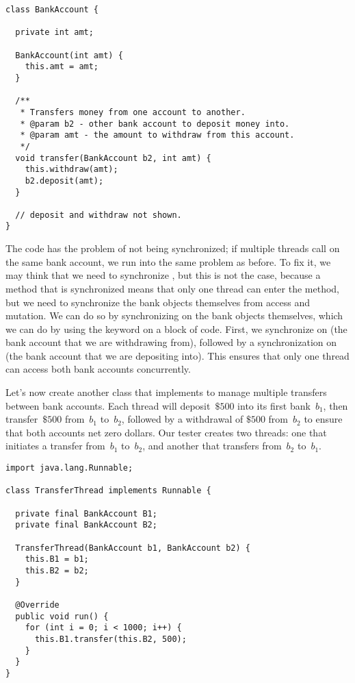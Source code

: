 \begin{lstlisting}[language=MyJava]
class BankAccount {

  private int amt;

  BankAccount(int amt) { 
    this.amt = amt; 
  }

  /**
   * Transfers money from one account to another.
   * @param b2 - other bank account to deposit money into.
   * @param amt - the amount to withdraw from this account.
   */
  void transfer(BankAccount b2, int amt) {
    this.withdraw(amt);
    b2.deposit(amt);
  }

  // deposit and withdraw not shown.
}
\end{lstlisting}

The code has the problem of not being synchronized; if multiple threads call  on the same bank account, we run into the same problem as before. 
To fix it, we may think that we need to synchronize , but this is not the case, because a method that is synchronized means that only one thread can enter the method, but we need to synchronize the bank objects themselves from access and mutation. 
We can do so by synchronizing on the bank objects themselves, which we can do by using the  keyword on a block of code. 
First, we synchronize on  (the bank account that we are withdrawing from), followed by a synchronization on  (the bank account that we are depositing into). 
This ensures that only one thread can access both bank accounts concurrently.

Let's now create another class that implements  to manage multiple transfers between bank accounts. 
Each thread will deposit~$\$500$ into its first bank~$b_1$, then transfer~$\$500$ from~$b_1$ to~$b_2$, followed by a withdrawal of $\$500$ from~$b_2$ to ensure that both accounts net zero dollars. 
Our tester creates two threads: one that initiates a transfer from~$b_1$ to~$b_2$, and another that transfers from~$b_2$ to~$b_1$.

\begin{lstlisting}[language=MyJava]
import java.lang.Runnable;

class TransferThread implements Runnable {

  private final BankAccount B1;
  private final BankAccount B2;

  TransferThread(BankAccount b1, BankAccount b2) {
    this.B1 = b1;
    this.B2 = b2;
  }

  @Override
  public void run() {
    for (int i = 0; i < 1000; i++) { 
      this.B1.transfer(this.B2, 500); 
    }
  }
}
\end{lstlisting}

